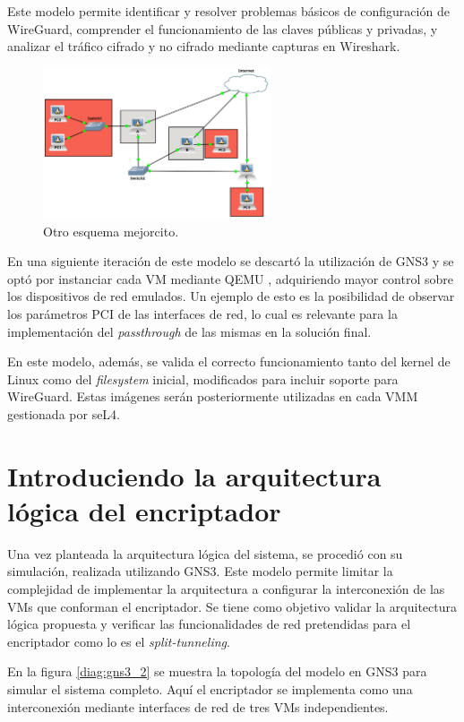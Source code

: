 Este modelo permite identificar y resolver problemas básicos de configuración de WireGuard, comprender el funcionamiento de las claves públicas y privadas, y analizar el tráfico cifrado y no cifrado mediante capturas en Wireshark.

\begin{figure}[h!]
    \centering
    \includegraphics[width=0.6\textwidth]{../figs/gns3_1.png}
    \caption{Otro esquema mejorcito.}
    \label{diag:wg_minimal}
\end{figure}

En una siguiente iteración de este modelo se descartó la utilización de GNS3 y se optó por instanciar cada VM mediante QEMU %
, adquiriendo mayor control sobre los dispositivos de red emulados. Un ejemplo de esto es la posibilidad de observar los parámetros PCI de las interfaces de red, lo cual es relevante para la implementación del \textit{passthrough} de las mismas en la solución final.

En este modelo, además, se valida el correcto funcionamiento tanto del kernel de Linux como del \textit{filesystem} inicial, modificados para incluir soporte para WireGuard. Estas imágenes serán posteriormente utilizadas en cada VMM gestionada por seL4.

\section{Introduciendo la arquitectura lógica del encriptador}
Una vez planteada la arquitectura lógica del sistema, se procedió con su simulación, realizada utilizando GNS3. Este modelo permite limitar la complejidad de implementar la arquitectura a configurar la interconexión de las VMs que conforman el encriptador. Se tiene como objetivo validar la arquitectura lógica propuesta y verificar las funcionalidades de red pretendidas para el encriptador como lo es el \textit{split-tunneling}.

En la figura \ref{diag:gns3_2} se muestra la topología del modelo en GNS3 para simular el sistema completo. Aquí el encriptador se implementa como una interconexión mediante interfaces de red de tres VMs independientes. 

